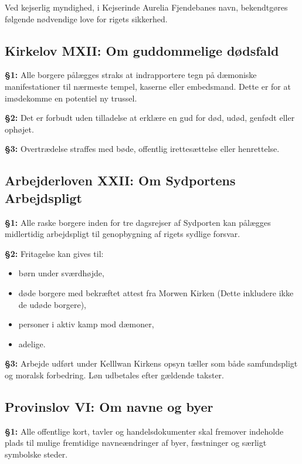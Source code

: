 \documentclass[a4paper,12pt]{memoir}
\newenvironment{infobox}[1]
{\begin{tcolorbox}[
  title=\textsf{\bfseries #1},
  colback=black!3,
  colframe=black!65,
  fonttitle=\small,
  fontupper=\small,
  boxsep=4pt,
  left=5pt,
  right=5pt,
  top=5pt,
  bottom=5pt,
  sharp corners
]}
{\end{tcolorbox}}
\newcommand{\paragraf}[1]{%
  \par\medskip
  \noindent\textbf{\S#1:}%
}
\begin{document}
\par\medskip

\begin{infobox}{NYE LOVE FRA IMPERIET}
Ved kejserlig myndighed, i Kejserinde Aurelia Fjendebanes navn, bekendtgøres følgende nødvendige love for rigets sikkerhed.
\end{infobox}

\subsection*{Kirkelov MXII: Om guddommelige dødsfald}

\paragraf{1} Alle borgere pålægges straks at indrapportere tegn på dæmoniske manifestationer til nærmeste tempel, kaserne eller embedsmand. Dette er for at imødekomme en potentiel ny trussel.

\paragraf{2} Det er forbudt uden tilladelse at erklære en gud for død, udød, genfødt eller ophøjet.

\paragraf{3} Overtrædelse straffes med bøde, offentlig irettesættelse eller henrettelse.

\subsection*{Arbejderloven XXII: Om Sydportens Arbejdspligt}

\paragraf{1} Alle raske borgere inden for tre dagsrejser af Sydporten kan pålægges midlertidig arbejdspligt til genopbygning af rigets sydlige forsvar.

\paragraf{2} Fritagelse kan gives til:
\begin{itemize}
  \item børn under sværdhøjde,
  \item døde borgere med bekræftet attest fra Morwen Kirken (Dette inkludere ikke de udøde borgere),
  \item personer i aktiv kamp mod dæmoner,
  \item adelige.
\end{itemize}

\paragraf{3} Arbejde udført under Kelllwan Kirkens opsyn tæller som både samfundspligt og moralsk forbedring. Løn udbetales efter gældende takster.

\subsection*{Provinslov VI: Om navne og byer}

\paragraf{1} Alle offentlige kort, tavler og handelsdokumenter skal fremover indeholde plads til mulige fremtidige navneændringer af byer, fæstninger og særligt symbolske steder.
\end{document}
